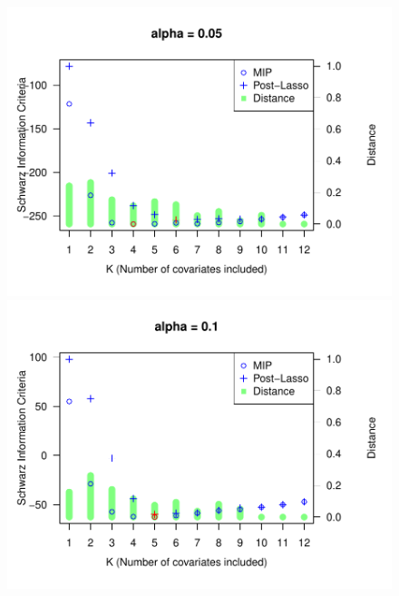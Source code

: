 \begin{figure}
	\centering
	\begin{minipage}[t]{0.4\linewidth}
		\centering
		\begin{minipage}[t]{\linewidth}
			\centering     \includegraphics[width=\textwidth]{Figuras/SIC005.pdf}
		\end{minipage}
		\begin{minipage}[b]{\linewidth}
			\centering     \includegraphics[width=\textwidth]{Figuras/SIC01.pdf}
		\end{minipage}
		\begin{minipage}[b]{\linewidth}

\end{minipage}
\end{minipage}
\end{figure}
